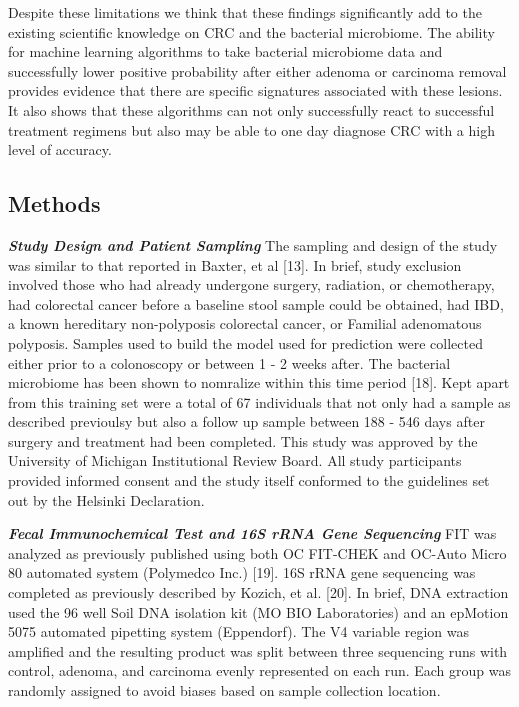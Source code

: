 \documentclass[12pt,]{article}
\begin{document}
Despite these limitations we think that these findings significantly add
to the existing scientific knowledge on CRC and the bacterial
microbiome. The ability for machine learning algorithms to take
bacterial microbiome data and successfully lower positive probability
after either adenoma or carcinoma removal provides evidence that there
are specific signatures associated with these lesions. It also shows
that these algorithms can not only successfully react to successful
treatment regimens but also may be able to one day diagnose CRC with a
high level of accuracy.

\newpage

\subsection{Methods}\label{methods}

\textbf{\emph{Study Design and Patient Sampling}} The sampling and
design of the study was similar to that reported in Baxter, et al
{[}13{]}. In brief, study exclusion involved those who had already
undergone surgery, radiation, or chemotherapy, had colorectal cancer
before a baseline stool sample could be obtained, had IBD, a known
hereditary non-polyposis colorectal cancer, or Familial adenomatous
polyposis. Samples used to build the model used for prediction were
collected either prior to a colonoscopy or between 1 - 2 weeks after.
The bacterial microbiome has been shown to nomralize within this time
period {[}18{]}. Kept apart from this training set were a total of 67
individuals that not only had a sample as described previoulsy but also
a follow up sample between 188 - 546 days after surgery and treatment
had been completed. This study was approved by the University of
Michigan Institutional Review Board. All study participants provided
informed consent and the study itself conformed to the guidelines set
out by the Helsinki Declaration.

\textbf{\emph{Fecal Immunochemical Test and 16S rRNA Gene Sequencing}}
FIT was analyzed as previously published using both OC FIT-CHEK and
OC-Auto Micro 80 automated system (Polymedco Inc.) {[}19{]}. 16S rRNA
gene sequencing was completed as previously described by Kozich, et al.
{[}20{]}. In brief, DNA extraction used the 96 well Soil DNA isolation
kit (MO BIO Laboratories) and an epMotion 5075 automated pipetting
system (Eppendorf). The V4 variable region was amplified and the
resulting product was split between three sequencing runs with control,
adenoma, and carcinoma evenly represented on each run. Each group was
randomly assigned to avoid biases based on sample collection location.
\end{document}
